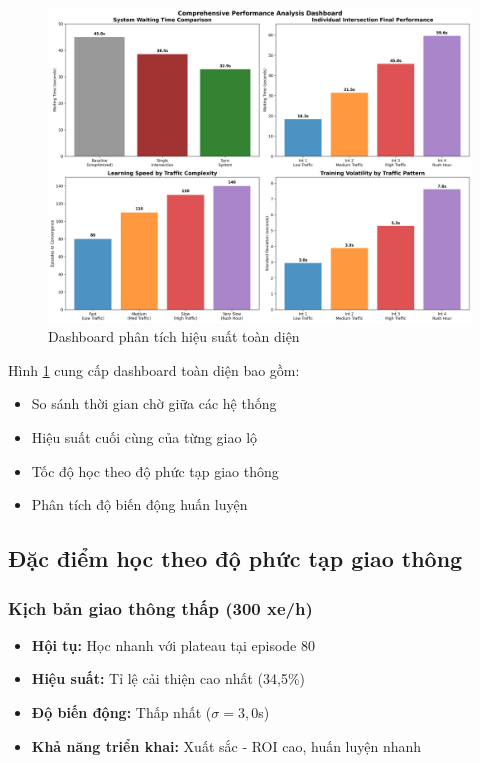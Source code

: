 \begin{figure}[!htp]
    \centering
    \includegraphics[width=\textwidth]{figures/03_performance_dashboard.png}
    \caption{Dashboard phân tích hiệu suất toàn diện}
    \label{fig:performance_dashboard}
\end{figure}

Hình \ref{fig:performance_dashboard} cung cấp dashboard toàn diện bao gồm:
\begin{itemize}
    \item So sánh thời gian chờ giữa các hệ thống
    \item Hiệu suất cuối cùng của từng giao lộ
    \item Tốc độ học theo độ phức tạp giao thông
    \item Phân tích độ biến động huấn luyện
\end{itemize}

\subsection{Đặc điểm học theo độ phức tạp giao thông}

\subsubsection{Kịch bản giao thông thấp (300 xe/h)}
\begin{itemize}
    \item \textbf{Hội tụ:} Học nhanh với plateau tại episode 80
    \item \textbf{Hiệu suất:} Tỉ lệ cải thiện cao nhất (34,5\%)
    \item \textbf{Độ biến động:} Thấp nhất ($\sigma = 3,0$s)
    \item \textbf{Khả năng triển khai:} Xuất sắc - ROI cao, huấn luyện nhanh
\end{itemize}

